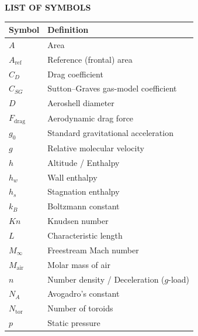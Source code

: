 \clearpage
{}
{}
\begin{center}
{\bfseries \Large LIST OF SYMBOLS}
\end{center}
\vspace{3em}

\begin{center}
\begin{tabularx}{0.8\textwidth} { 
   >{\raggedright\arraybackslash}X 
   >{\raggedright\arraybackslash}X}
    \hline
    \textbf{Symbol} & \textbf{Definition}            \\
    \hline
    $A$         & Area                                  \\
    $A_{\text{ref}}$ & Reference (frontal) area         \\
    $C_D$       & Drag coefficient                      \\
    $C_{SG}$    & Sutton--Graves gas-model coefficient  \\
    $D$         & Aeroshell diameter                    \\
    $F_{\text{drag}}$ & Aerodynamic drag force          \\
    $g_0$       & Standard gravitational acceleration   \\
    $g$         & Relative molecular velocity           \\
    $h$         & Altitude / Enthalpy                   \\
    $h_w$       & Wall enthalpy                         \\
    $h_s$       & Stagnation enthalpy                   \\
    $k_B$       & Boltzmann constant                    \\
    $Kn$        & Knudsen number                        \\
    $L$         & Characteristic length                 \\
    $M_\infty$  & Freestream Mach number                \\
    $M_{\text{air}}$ & Molar mass of air                \\
    $n$         & Number density / Deceleration ($g$-load) \\
    $N_A$       & Avogadro's constant                   \\
    $N_{\text{tor}}$ & Number of toroids                \\
    $p$         & Static pressure                       \\

\end{tabularx}
\end{center}
